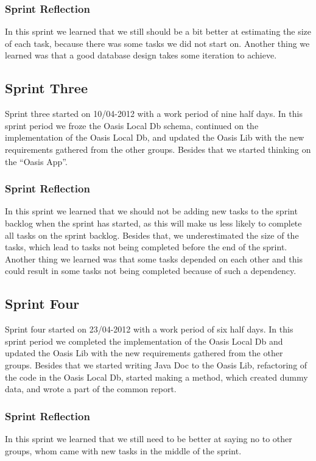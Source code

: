 \subsubsection{Sprint Reflection}
In this sprint we learned that we still should be a bit better at estimating the size of each task, because there was some tasks we did not start on.
Another thing we learned was that a good database design takes some iteration to achieve.

\subsection{Sprint Three}
Sprint three started on 10/04-2012 with a work period of nine half days. In this sprint period we froze the Oasis Local Db schema, continued on the implementation of the Oasis Local Db, and updated the Oasis Lib with the new requirements gathered from the other groups. 
Besides that we started thinking on the ``Oasis App''.

\subsubsection{Sprint Reflection}
In this sprint we learned that we should not be adding new tasks to the sprint backlog when the sprint has started, as this will make us less likely to complete all tasks on the sprint backlog.
Besides that, we underestimated the size of the tasks, which lead to tasks not being completed before the end of the sprint.
Another thing we learned was that some tasks depended on each other and this could result in some tasks not being completed because of such a dependency.

\subsection{Sprint Four}
Sprint four started on 23/04-2012 with a work period of six half days. In this sprint period we completed the implementation of the Oasis Local Db and updated the Oasis Lib with the new requirements gathered from the other groups. Besides that we started writing Java Doc to the Oasis Lib, refactoring of the code in the Oasis Local Db, started making a method, which created dummy data, and wrote a part of the common report.

\subsubsection{Sprint Reflection}
In this sprint we learned that we still need to be better at saying no to other groups, whom came with new tasks in the middle of the sprint.

